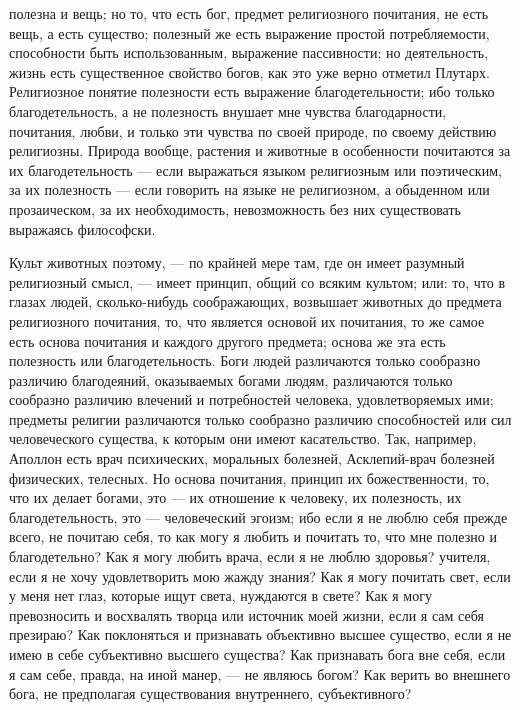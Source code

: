 \documentclass[12pt]{article}
\begin{document}
полезна и вещь; но то, что есть бог, предмет религиозного почитания, не есть вещь, а есть существо; полезный же есть выражение простой потребляемости, способности быть использованным, выражение пассивности; но деятельность, жизнь есть существенное свойство богов, как это уже верно отметил Плутарх. Религиозное понятие полезности есть выражение благодетельности; ибо только благодетельность, а не полезность внушает мне чувства благодарности, почитания, любви, и только эти чувства по своей природе, по своему действию религиозны. Природа вообще, растения и животные в особенности почитаются за их благодетельность --- если выражаться языком религиозным или поэтическим, за их полезность --- если говорить на языке не религиозном, а обыденном или прозаическом, за их необходимость, невозможность без них существовать выражаясь философски. 

Культ животных поэтому, --- по крайней мере там, где он имеет разумный религиозный смысл, --- имеет принцип, общий со всяким культом; или: то, что в глазах людей, сколько-нибудь соображающих, возвышает животных до предмета религиозного почитания, то, что является основой их почитания, то же самое есть основа почитания и каждого другого предмета; основа же эта есть полезность или благодетельность. Боги людей различаются только сообразно различию благодеяний, оказываемых богами людям, различаются только сообразно различию влечений и потребностей человека, удовлетворяемых ими; предметы религии различаются только сообразно различию способностей или сил человеческого существа, к которым они имеют касательство. Так, например, Аполлон есть врач психических, моральных болезней, Асклепий-врач болезней физических, телесных. Но основа почитания, принцип их божественности, то, что их делает богами, это --- их отношение к человеку, их полезность, их благодетельность, это --- человеческий эгоизм; ибо если я не люблю себя прежде всего, не почитаю себя, то как могу я любить и почитать то, что мне полезно и благодетельно? Как я могу любить врача, если я не люблю здоровья? учителя, если я не хочу удовлетворить мою жажду знания? Как я могу почитать свет, если у меня нет глаз, которые ищут света, нуждаются в свете? Как я могу превозносить и восхвалять творца или источник моей жизни, если я сам себя презираю? Как поклоняться и признавать объективно высшее существо, если я не имею в себе субъективно высшего существа? Как признавать бога вне себя, если я сам себе, правда, на иной манер, --- не являюсь богом? Как верить во внешнего бога, не предполагая существования внутреннего, субъективного? 
\end{document}

